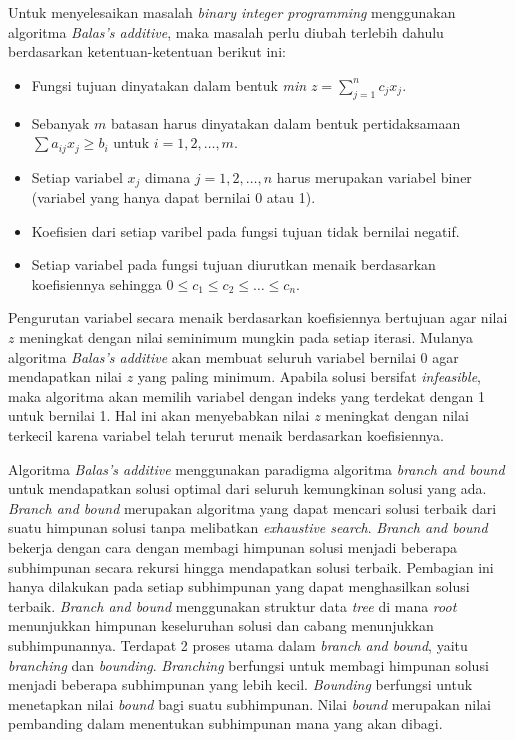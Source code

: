 Untuk menyelesaikan masalah \textit{binary integer programming} menggunakan algoritma \textit{Balas's additive}, maka masalah perlu diubah terlebih dahulu berdasarkan ketentuan-ketentuan berikut ini:

\begin{itemize}
	\item Fungsi tujuan dinyatakan dalam bentuk \textit{min} \(z=\sum_{j=1}^{n}c_jx_j\).
	\item Sebanyak \(m\) batasan harus dinyatakan dalam bentuk pertidaksamaan \(\sum a_{ij} x_j\geq b_i\) untuk \(i=1,2,\dots,m\).
	\item Setiap variabel \(x_j\) dimana \(j=1,2,\dots,n\) harus merupakan variabel biner (variabel yang hanya dapat bernilai 0 atau 1).
	\item Koefisien dari setiap varibel pada fungsi tujuan tidak bernilai negatif.
	\item Setiap variabel pada fungsi tujuan diurutkan menaik berdasarkan koefisiennya sehingga \(0\leq c_1 \leq c_2 \leq \dots \leq c_n\).
\end{itemize}

Pengurutan variabel secara menaik berdasarkan koefisiennya bertujuan agar nilai \(z\) meningkat dengan nilai seminimum mungkin pada setiap iterasi. Mulanya algoritma \textit{Balas's additive} akan membuat seluruh variabel bernilai 0 agar mendapatkan nilai \(z\) yang paling minimum. Apabila solusi bersifat \textit{infeasible}, maka algoritma akan memilih variabel dengan indeks yang terdekat dengan 1 untuk bernilai 1. Hal ini akan menyebabkan nilai \(z\) meningkat dengan nilai terkecil karena variabel telah terurut menaik berdasarkan koefisiennya.

Algoritma \textit{Balas's additive} menggunakan paradigma algoritma \textit{branch and bound}~\cite{narendra1977branch} untuk mendapatkan solusi optimal dari seluruh kemungkinan solusi yang ada. \textit{Branch and bound} merupakan algoritma yang dapat mencari solusi terbaik dari suatu himpunan solusi tanpa melibatkan \textit{exhaustive search}. \textit{Branch and bound} bekerja dengan cara dengan membagi himpunan solusi menjadi beberapa subhimpunan secara rekursi hingga mendapatkan solusi terbaik. Pembagian ini hanya dilakukan pada setiap subhimpunan yang dapat menghasilkan solusi terbaik. \textit{Branch and bound} menggunakan struktur data \textit{tree} di mana \textit{root} menunjukkan himpunan keseluruhan solusi dan cabang menunjukkan subhimpunannya. Terdapat 2 proses utama dalam \textit{branch and bound}, yaitu \textit{branching} dan \textit{bounding}. \textit{Branching} berfungsi untuk membagi himpunan solusi menjadi beberapa subhimpunan yang lebih kecil. \textit{Bounding} berfungsi untuk menetapkan nilai \textit{bound} bagi suatu subhimpunan. Nilai \textit{bound} merupakan nilai pembanding dalam menentukan subhimpunan mana yang akan dibagi.

